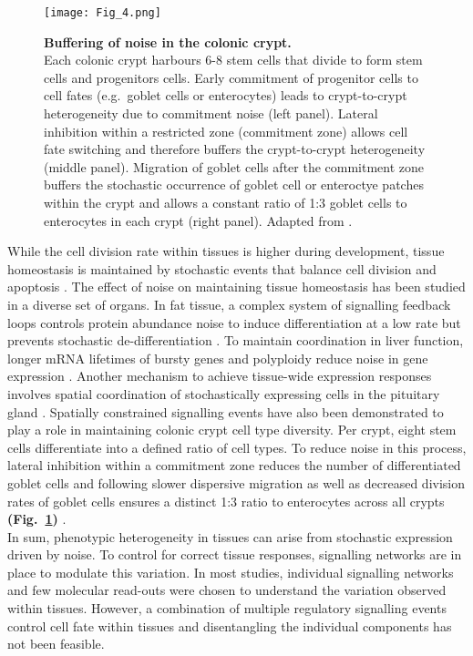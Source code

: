 \begin{figure}[!h]
\centering
\texttt{[image: Fig\_4.png]}
\caption[Buffering of noise in the colonic crypt]{\textbf{Buffering of noise in the colonic crypt.}\\
Each colonic crypt harbours 6-8 stem cells that divide to form stem cells and progenitors cells. 
Early commitment of progenitor cells to cell fates (e.g.~goblet cells or enterocytes) leads to crypt-to-crypt heterogeneity due to commitment noise (left panel). 
Lateral inhibition within a restricted zone (commitment zone) allows cell fate switching and therefore buffers the crypt-to-crypt heterogeneity (middle panel). 
Migration of goblet cells after the commitment zone buffers the stochastic occurrence of goblet cell or enteroctye patches within the crypt and allows a constant ratio of 1:3 goblet cells to enterocytes in each crypt (right panel). 
Adapted from \citep{Toth2017}.}
\label{fig0:noise_tissue}
\end{figure}

While the cell division rate within tissues is higher during development, tissue homeostasis is maintained by stochastic events that balance cell division and apoptosis \citep{Ranft2010}. 
The effect of noise on maintaining tissue homeostasis has been studied in a diverse set of organs. 
In fat tissue, a complex system of signalling feedback loops controls protein abundance noise to induce differentiation at a low rate but prevents stochastic de-differentiation \citep{Ahrends2014}. 
To maintain coordination in liver function, longer mRNA lifetimes of bursty genes and polyploidy reduce noise in gene expression \citep{BaharHalpern2015}. 
Another mechanism to achieve tissue-wide expression responses involves spatial coordination of stochastically expressing cells in the pituitary gland \citep{Featherstone2016}. 
Spatially constrained signalling events have also been demonstrated to play a role in maintaining colonic crypt cell type diversity. 
Per crypt, eight stem cells differentiate into a defined ratio of cell types. To reduce noise in this process, lateral inhibition within a commitment zone reduces the number of differentiated goblet cells and following slower dispersive migration as well as decreased division rates of goblet cells ensures a distinct 1:3 ratio to enterocytes across all crypts \textbf{(Fig.~\ref{fig0:noise_tissue})} \citep{Toth2017}.\\

In sum, phenotypic heterogeneity in tissues can arise from stochastic expression driven by noise.
To control for correct tissue responses, signalling networks are in place to modulate this variation. 
In most studies, individual signalling networks and few molecular read-outs were chosen to understand the variation observed within tissues.
However, a combination of multiple regulatory signalling events control cell fate within tissues and disentangling the individual components has not been feasible.

